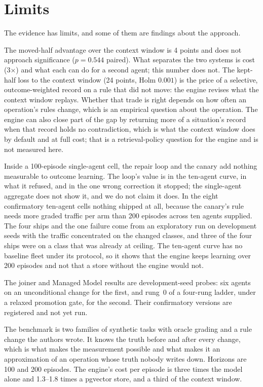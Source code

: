 \documentclass[11pt]{article}
\begin{document}
\section{Limits}
\label{sec:limits}

The evidence has limits, and some of them are findings about the approach.

The moved-half advantage over the context window is 4 points and does not approach
significance ($p = 0.544$ paired). What separates the two systems is cost (3$\times$) and what
each can do for a second agent; this number does not. The kept-half loss to the context window
(24 points, Holm $0.001$) is the price of a selective, outcome-weighted record on a rule that
did not move: the engine revises what the context window replays. Whether that trade is
right depends on how often an operation's rules change, which is an empirical question about the
operation. The engine can also close part of the gap by returning more of a situation's record
when that record holds no contradiction, which is what the context window does by default and
at full cost; that is a retrieval-policy question for the engine and is not measured here.

Inside a 100-episode single-agent cell, the repair loop and the canary add nothing measurable
to outcome learning. The loop's value is in the ten-agent curve, in what it refused, and in the
one wrong correction it stopped; the single-agent aggregate does not show it, and we do not
claim it does. In the eight confirmatory ten-agent cells nothing shipped at all, because the
canary's rule needs more graded traffic per arm than 200 episodes across ten agents supplied.
The four ships and the one failure come from an exploratory run on development seeds with the
traffic concentrated on the changed classes, and three of the four ships were on a class that
was already at ceiling. The ten-agent curve has no baseline fleet under its protocol, so it
shows that the engine keeps learning over 200 episodes and not that a store without the engine
would not.

The joiner and Managed Model results are development-seed probes: six agents on an
unconditional change for the first, and rung~0 of a four-rung ladder, under a relaxed promotion
gate, for the second. Their confirmatory versions are registered and not yet run.

The benchmark is two families of synthetic tasks with oracle grading and a rule change the
authors wrote. It knows the truth before and after every change, which is what makes the
measurement possible and what makes it an approximation of an operation whose truth nobody
writes down. Horizons are 100 and 200 episodes. The engine's cost per episode is three times the
model alone and 1.3--1.8 times a pgvector store, and a third of the context window.
\end{document}
